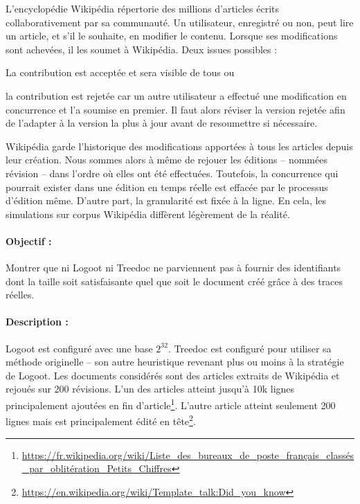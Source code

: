 L'encyclopédie Wikipédia répertorie des millions d'articles écrits
collaborativement par sa communauté. Un utilisateur, enregistré ou non, peut
lire un article, et s'il le souhaite, en modifier le contenu. Lorsque ses
modifications sont achevées, il les soumet à Wikipédia. Deux issues possibles :
\begin{inparaenum}[(i)]
\item La contribution est acceptée et sera visible de tous ou
\item la contribution est rejetée car un autre utilisateur a effectué une
  modification en concurrence et l'a soumise en premier. Il faut alors réviser
  la version rejetée afin de l'adapter à la version la plus à jour avant de
  resoumettre si nécessaire.
\end{inparaenum}
Wikipédia garde l'historique des modifications apportées à tous les articles
depuis leur création. Nous sommes alors à même de rejouer les éditions --
nommées révision -- dans l'ordre où elles ont été effectuées. Toutefois, la
concurrence qui pourrait exister dans une édition en temps réelle est effacée
par le processus d'édition même. D'autre part, la granularité est fixée à la
ligne. En cela, les simulations sur corpus Wikipédia diffèrent légèrement de la
réalité.

\paragraph{Objectif :} Montrer que ni Logoot ni Treedoc ne parviennent pas à
fournir des identifiants dont la taille soit satisfaisante quel que soit le
document créé grâce à des traces réelles.

\paragraph{Description :} Logoot est configuré avec une base $2^{32}$. Treedoc
est configuré pour utiliser sa méthode originelle -- son autre heuristique
revenant plus ou moins à la stratégie de Logoot. Les documents considérés sont
des articles extraits de Wikipédia et rejoués sur 200 révisions. L'un des
articles atteint jusqu'à 10k lignes principalement ajoutées en fin
d'article\footnote{\scriptsize\url{https://fr.wikipedia.org/wiki/Liste_des_bureaux_de_poste_français_classés_par_oblitération_Petits_Chiffres}}. L'autre
article atteint seulement 200 lignes mais est principalement édité en
tête\footnote{\scriptsize\url{https://en.wikipedia.org/wiki/Template_talk:Did_you_know}}.

